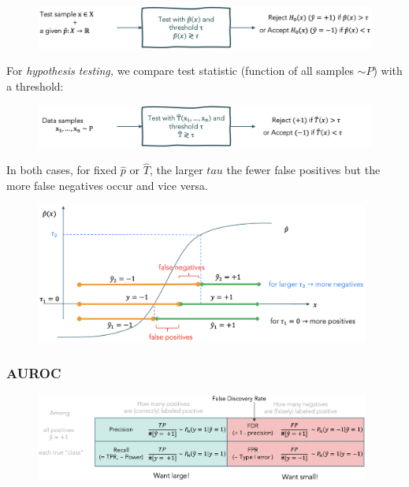 \documentclass[a4paper]{extarticle}
\begin{document}
\begin{figure}[H]
    \includegraphics[width=15cm]{../images/IntroML_Fig4-14}
    \centering
\end{figure}

For \textit{hypothesis testing,} we compare test statistic (function of all samples \(\sim P\)) with a threshold:

\begin{figure}[H]
    \includegraphics[width=15cm]{../images/IntroML_Fig4-15}
    \centering
\end{figure}

In both cases, for fixed \(\hat{p}\) or \(\hat{T}\), the larger \(tau\) the fewer false positives but the more false negatives occur and vice versa.

\begin{figure}[H]
    \includegraphics[width=11cm]{../images/IntroML_Fig4-16}
    \centering
\end{figure}

\subsubsection{AUROC}

\begin{figure}[H]
    \includegraphics[width=11cm]{../images/IntroML_Fig4-17}
    \centering
\end{figure}
\end{document}
